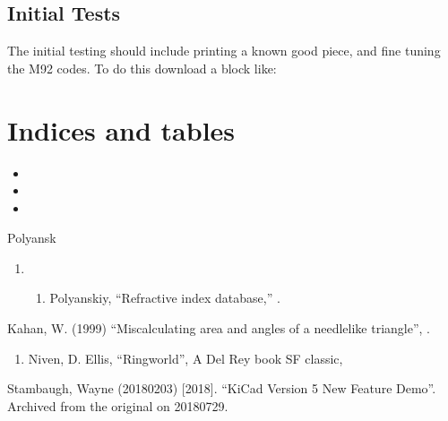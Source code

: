 \documentclass[letterpaper,10pt,english,openany,oneside]{sphinxmanual}
\begin{document}
\section{Initial Tests}
\label{\detokenize{merlin:initial-tests}}
\sphinxAtStartPar
The initial testing should include printing a known good piece, and fine
tuning the M92 codes. To do this download a block like:

\sphinxAtStartPar
{}


\chapter{Indices and tables}
\label{\detokenize{index:indices-and-tables}}\begin{itemize}
\item {} 
\sphinxAtStartPar
{}

\item {} 
\sphinxAtStartPar
{}

\item {} 
\sphinxAtStartPar
{}

\end{itemize}

\begin{sphinxthebibliography}{Polyansk}
\begin{enumerate}
%
\setcounter{enumi}{12}
\item {} \begin{enumerate}
%
\setcounter{enumii}{13}
\item {} 
\sphinxAtStartPar
Polyanskiy, “Refractive index database,” .

\end{enumerate}

\end{enumerate}
\sphinxAtStartPar
Kahan, W. (1999) “Miscalculating area and angles of a needle\sphinxhyphen{}like triangle”,  .
\begin{enumerate}
%
\setcounter{enumi}{11}
\item {} 
\sphinxAtStartPar
Niven,  D. Ellis, “Ringworld”, A Del Rey book SF classic, 

\end{enumerate}
\sphinxAtStartPar
Stambaugh, Wayne (2018\sphinxhyphen{}02\sphinxhyphen{}03) {[}2018{]}. “KiCad Version 5 New Feature Demo”. Archived from the original on 2018\sphinxhyphen{}07\sphinxhyphen{}29. 
\end{sphinxthebibliography}



\renewcommand{\indexname}{Index}
\printindex
\end{document}
